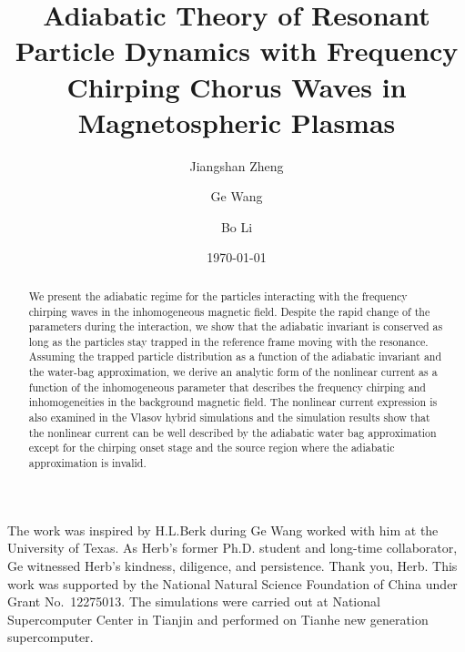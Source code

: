 \documentclass[showkeys,reprint,superscriptaddress]{revtex4-2}
\begin{document}
\title{Adiabatic Theory of Resonant Particle Dynamics with Frequency Chirping Chorus Waves in Magnetospheric Plasmas}
\author{Jiangshan Zheng}
\author{Ge Wang}
\author{Bo Li}
\date{\today}

\begin{abstract}
 We present the adiabatic regime for the particles interacting with the frequency chirping waves in the inhomogeneous magnetic field. 
 Despite the rapid change of the parameters during the interaction, we show that the adiabatic invariant is conserved as long as the particles stay trapped in the reference frame moving with the resonance.
Assuming the trapped particle distribution as a function of the adiabatic invariant and  the water-bag approximation, we derive an analytic form of the nonlinear current as a function of  the inhomogeneous parameter that describes the frequency chirping and inhomogeneities in the background magnetic field.
The nonlinear current expression  is also examined in the  Vlasov hybrid simulations
and the simulation results show that  the nonlinear current can be well described by the adiabatic water bag approximation  except for the chirping onset stage and the source region where the adiabatic approximation is invalid.
\end{abstract}
\maketitle









\begin{acknowledgments}
    The work was inspired by H.L.Berk during Ge Wang worked with him at the University of Texas.
    As Herb’s former Ph.D. student and long-time collaborator, Ge witnessed Herb’s kindness, diligence, and persistence. Thank you, Herb. 
    This work was supported by the National Natural Science Foundation of China under Grant No.~12275013.
    The simulations were carried out at National Supercomputer Center in Tianjin and  performed on Tianhe new generation supercomputer.
\end{acknowledgments}


\end{document}
